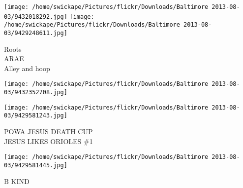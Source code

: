 \documentclass[10pt,letterpaper]{article}
\begin{document}
\vspace{0.25in}
\texttt{[image: /home/swickape/Pictures/flickr/Downloads/Baltimore 2013-08-03/9432018292.jpg]}
\texttt{[image: /home/swickape/Pictures/flickr/Downloads/Baltimore 2013-08-03/9429248611.jpg]}

Roots\\
ARAE\\
Alley and hoop\\
\pagebreak

\texttt{[image: /home/swickape/Pictures/flickr/Downloads/Baltimore 2013-08-03/9432352708.jpg]}

\vspace{0.25in}
\texttt{[image: /home/swickape/Pictures/flickr/Downloads/Baltimore 2013-08-03/9429581243.jpg]}

POWA JESUS DEATH CUP\\
JESUS LIKES ORIOLES \#1\\
\pagebreak

\texttt{[image: /home/swickape/Pictures/flickr/Downloads/Baltimore 2013-08-03/9429581445.jpg]}

B KIND\\
\pagebreak
\end{document}
